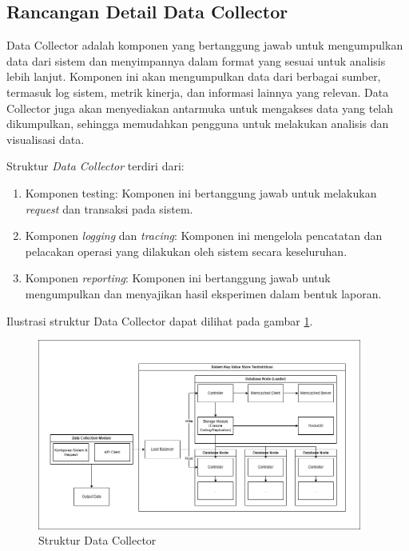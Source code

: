 \subsection{Rancangan Detail Data Collector}
\label{subsection:detail-data-collector}

Data Collector adalah komponen yang bertanggung jawab untuk mengumpulkan data dari sistem dan menyimpannya dalam format yang sesuai untuk analisis lebih lanjut. Komponen ini akan mengumpulkan data dari berbagai sumber, termasuk log sistem, metrik kinerja, dan informasi lainnya yang relevan.
Data Collector juga akan menyediakan antarmuka untuk mengakses data yang telah dikumpulkan, sehingga memudahkan pengguna untuk melakukan analisis dan visualisasi data.

Struktur \textit{Data Collector} terdiri dari:

\begin{enumerate}
    \item Komponen testing: Komponen ini bertanggung jawab untuk melakukan \textit{request} dan transaksi pada sistem.
    \item Komponen \textit{logging} dan \textit{tracing}: Komponen ini mengelola pencatatan dan pelacakan operasi yang dilakukan oleh sistem secara keseluruhan.
    \item Komponen \textit{reporting}: Komponen ini bertanggung jawab untuk mengumpulkan dan menyajikan hasil eksperimen dalam bentuk laporan.
\end{enumerate}

Ilustrasi struktur Data Collector dapat dilihat pada gambar \ref{fig:data-collector-structure}.

\begin{figure}[ht]
    \centering
    \includegraphics[width=0.95\textwidth]{resources/chapter-3/general-architecture.png}
    \caption{Struktur Data Collector}
    \label{fig:data-collector-structure}
\end{figure}
